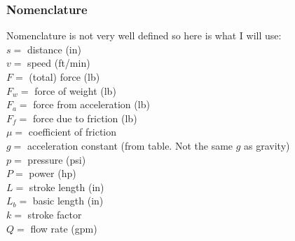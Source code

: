 \documentclass[11pt, fleqn]{article}
\begin{document}
\subsubsection{Nomenclature}
Nomenclature is not very well defined so here is what I will use:\\
$s=$ distance (in)\\
$v=$ speed (ft/min)\\
$F=$ (total) force (lb)\\
$F_w=$ force of weight (lb)\\
$F_a=$ force from acceleration (lb)\\
$F_f=$ force due to friction (lb)\\
$\mu=$ coefficient of friction\\
$g=$ acceleration constant (from table. Not the same $g$ as gravity)\\
$p=$ pressure (psi)\\
$P=$ power (hp)\\
$L=$ stroke length (in)\\
$L_b=$ basic length (in)\\
$k=$ stroke factor\\
$Q=$ flow rate (gpm)
\end{document}
